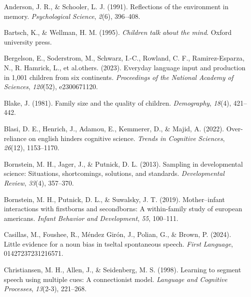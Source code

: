 \documentclass[
  man,floatsintext]{apa6}
\newlength{\cslhangindent}
\newlength{\cslentryspacingunit} %
\newenvironment{CSLReferences}[2] %
 {%
  \setlength{\parindent}{0pt}
  \ifodd #1
  \let\oldpar\par
  \def\par{\hangindent=\cslhangindent\oldpar}
  \fi
  \setlength{\parskip}{#2\cslentryspacingunit}
 }%
 {}
\begin{document}
\hypertarget{refs}{}
\begin{CSLReferences}{1}{0}
\leavevmode{}%
Anderson, J. R., \& Schooler, L. J. (1991). Reflections of the environment in memory. \emph{Psychological Science}, \emph{2}(6), 396--408.

\leavevmode{}%
Bartsch, K., \& Wellman, H. M. (1995). \emph{Children talk about the mind}. Oxford university press.

\leavevmode{}%
Bergelson, E., Soderstrom, M., Schwarz, I.-C., Rowland, C. F., Ramirez-Esparza, N., R. Hamrick, L., et al.others. (2023). Everyday language input and production in 1,001 children from six continents. \emph{Proceedings of the National Academy of Sciences}, \emph{120}(52), e2300671120.

\leavevmode{}%
Blake, J. (1981). Family size and the quality of children. \emph{Demography}, \emph{18}(4), 421--442.

\leavevmode{}%
Blasi, D. E., Henrich, J., Adamou, E., Kemmerer, D., \& Majid, A. (2022). Over-reliance on english hinders cognitive science. \emph{Trends in Cognitive Sciences}, \emph{26}(12), 1153--1170.

\leavevmode{}%
Bornstein, M. H., Jager, J., \& Putnick, D. L. (2013). Sampling in developmental science: Situations, shortcomings, solutions, and standards. \emph{Developmental Review}, \emph{33}(4), 357--370.

\leavevmode{}%
Bornstein, M. H., Putnick, D. L., \& Suwalsky, J. T. (2019). Mother--infant interactions with firstborns and secondborns: A within-family study of european americans. \emph{Infant Behavior and Development}, \emph{55}, 100--111.

\leavevmode{}%
Casillas, M., Foushee, R., Méndez Girón, J., Polian, G., \& Brown, P. (2024). Little evidence for a noun bias in tseltal spontaneous speech. \emph{First Language}, 01427237231216571.

\leavevmode{}%
Christiansen, M. H., Allen, J., \& Seidenberg, M. S. (1998). Learning to segment speech using multiple cues: A connectionist model. \emph{Language and Cognitive Processes}, \emph{13}(2-3), 221--268.


\end{CSLReferences}
\end{document}
